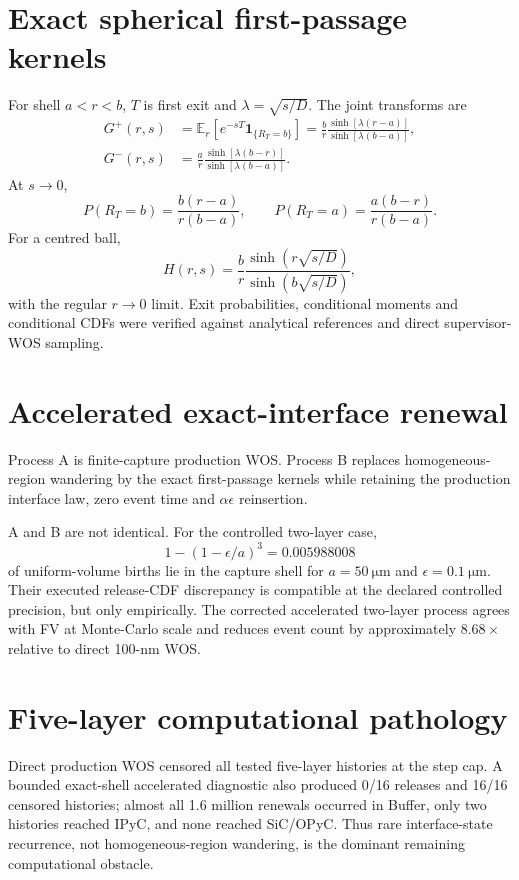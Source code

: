 \documentclass[11pt]{article}
\begin{document}
\section{Exact spherical first-passage kernels}
For shell $a<r<b$, $T$ is first exit and $\lambda=\sqrt{s/D}$. The joint transforms are
\begin{align}
G^+(r,s)&=\mathbb E_r[e^{-sT}\mathbf1_{\{R_T=b\}}]
=\frac{b}{r}\frac{\sinh[\lambda(r-a)]}{\sinh[\lambda(b-a)]},\\
G^-(r,s)&=\frac{a}{r}\frac{\sinh[\lambda(b-r)]}{\sinh[\lambda(b-a)]}.
\end{align}
At $s\to0$,
\begin{equation}
P(R_T=b)=\frac{b(r-a)}{r(b-a)},\qquad
P(R_T=a)=\frac{a(b-r)}{r(b-a)}.
\end{equation}
For a centred ball,
\begin{equation}
H(r,s)=\frac{b}{r}
\frac{\sinh(r\sqrt{s/D})}{\sinh(b\sqrt{s/D})},
\end{equation}
with the regular $r\to0$ limit. Exit probabilities, conditional moments and conditional CDFs were verified against analytical references and direct supervisor-WOS sampling.

\section{Accelerated exact-interface renewal}
Process A is finite-capture production WOS. Process B replaces homogeneous-region wandering by the exact first-passage kernels while retaining the production interface law, zero event time and $\alpha\epsilon$ reinsertion.

A and B are not identical. For the controlled two-layer case,
\begin{equation}
1-(1-\epsilon/a)^3=0.005988008
\end{equation}
of uniform-volume births lie in the capture shell for $a=\SI{50}{\micro\metre}$ and $\epsilon=\SI{0.1}{\micro\metre}$. Their executed release-CDF discrepancy is compatible at the declared controlled precision, but only empirically. The corrected accelerated two-layer process agrees with FV at Monte-Carlo scale and reduces event count by approximately $8.68\times$ relative to direct 100-nm WOS.

\section{Five-layer computational pathology}
Direct production WOS censored all tested five-layer histories at the step cap. A bounded exact-shell accelerated diagnostic also produced 0/16 releases and 16/16 censored histories; almost all 1.6 million renewals occurred in Buffer, only two histories reached IPyC, and none reached SiC/OPyC. Thus rare interface-state recurrence, not homogeneous-region wandering, is the dominant remaining computational obstacle.
\end{document}
